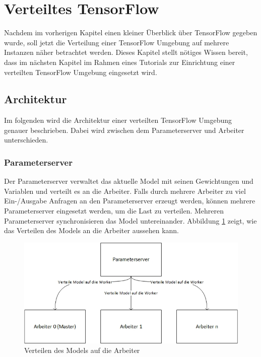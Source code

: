 \section{Verteiltes TensorFlow}
Nachdem im vorherigen Kapitel einen kleiner Überblick über TensorFlow gegeben wurde, soll jetzt die Verteilung einer TensorFlow Umgebung auf mehrere Instanzen näher betrachtet werden. Dieses Kapitel stellt nötiges Wissen bereit, dass im nächsten Kapitel im Rahmen eines Tutorials zur Einrichtung einer verteilten TensorFlow Umgebung eingesetzt wird. 

\subsection{Architektur}
Im folgenden wird die Architektur einer verteilten TensorFlow Umgebung genauer beschrieben. Dabei wird zwischen dem Parameterserver und Arbeiter unterschieden.

\subsubsection{Parameterserver}
Der Parameterserver verwaltet das aktuelle Model mit seinen Gewichtungen und Variablen und verteilt es an die Arbeiter. Falls durch mehrere Arbeiter zu viel Ein-/Ausgabe Anfragen an den Parameterserver erzeugt werden, können mehrere Parameterserver eingesetzt werden, um die Last zu verteilen. Mehreren Parameterserver synchronisieren das Model untereinander. Abbildung \ref{fig:architektur-servemodel} zeigt, wie das Verteilen des Models an die Arbeiter aussehen kann. 

\begin{figure}[h!]
	\centering
	\includegraphics[width=0.9\linewidth]{Pictures/Architektur-ServeModel}
	\caption[Verteilen des Models auf die Arbeiter]{Verteilen des Models auf die Arbeiter}
	\label{fig:architektur-servemodel}
\end{figure}

